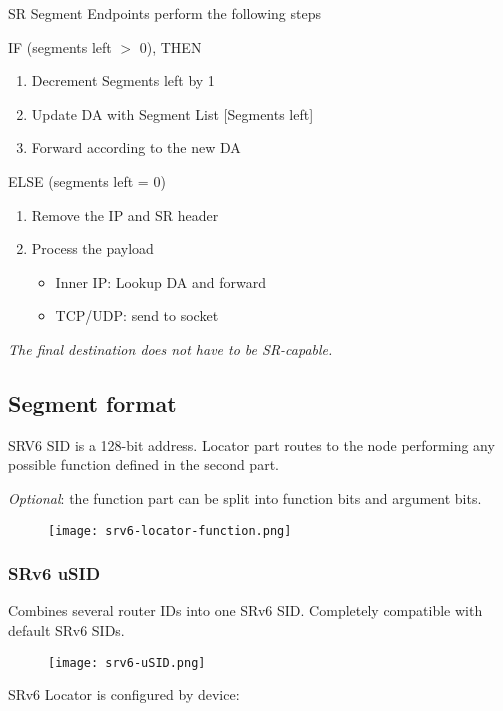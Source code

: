 \vspace{5mm}
\noindent
SR Segment Endpoints perform the following steps

\noindent
IF (segments left $>$ 0), THEN 
\begin{enumerate}
    \item Decrement Segments left by 1
    \item Update DA with Segment List [Segments left]
    \item Forward according to the new DA
\end{enumerate}

\noindent
ELSE (segments left = 0)
\begin{enumerate}
    \item Remove the IP and SR header
    \item Process the payload
    \begin{itemize}
        \item Inner IP: Lookup DA and forward
        \item TCP/UDP: send to socket
    \end{itemize}
\end{enumerate}

\emph{The final destination does not have to be SR-capable.}

\subsection{Segment format}
SRV6 SID is a 128-bit address.
Locator part routes to the node performing any possible function defined in the second part.

\emph{Optional}: the function part can be split into function bits and argument bits.
\begin{figure}[h]
    \centering
    \texttt{[image: srv6-locator-function.png]}
\end{figure}

\subsubsection{SRv6 uSID}
Combines several router IDs into one SRv6 SID. Completely compatible with default SRv6 SIDs.

\begin{figure}
    \centering
    \texttt{[image: srv6-uSID.png]}
\end{figure}

\vspace{5mm}
\noindent
SRv6 Locator is configured by device:

